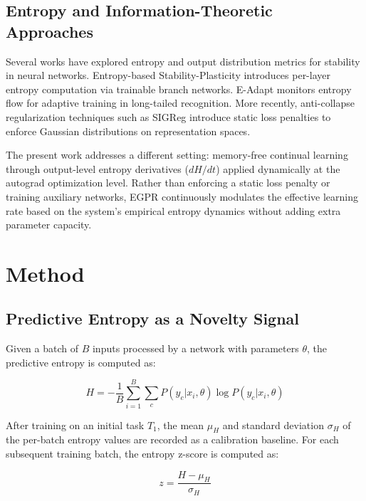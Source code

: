 \documentclass[11pt,a4paper]{article}
\begin{document}
\subsection{Entropy and Information-Theoretic Approaches}

Several works have explored entropy and output distribution metrics for stability in neural networks. Entropy-based Stability-Plasticity \citep[ESP;][]{chen2022entropy} introduces per-layer entropy computation via trainable branch networks. E-Adapt \citep{wang2026eadapt} monitors entropy flow for adaptive training in long-tailed recognition. More recently, anti-collapse regularization techniques such as SIGReg \citep{balestriero2025sigreg} introduce static loss penalties to enforce Gaussian distributions on representation spaces.

The present work addresses a different setting: memory-free continual learning through output-level entropy derivatives ($dH/dt$) applied dynamically at the autograd optimization level. Rather than enforcing a static loss penalty or training auxiliary networks, EGPR continuously modulates the effective learning rate based on the system's empirical entropy dynamics without adding extra parameter capacity.

\section{Method}

\subsection{Predictive Entropy as a Novelty Signal}

Given a batch of $B$ inputs processed by a network with parameters $\theta$, the predictive entropy is computed as:

\begin{equation}
H = -\frac{1}{B} \sum_{i=1}^{B} \sum_{c} P(y_c | x_i, \theta) \log P(y_c | x_i, \theta)
\end{equation}

After training on an initial task $T_1$, the mean $\mu_H$ and standard deviation $\sigma_H$ of the per-batch entropy values are recorded as a calibration baseline. For each subsequent training batch, the entropy z-score is computed as:

\begin{equation}
z = \frac{H - \mu_H}{\sigma_H}
\end{equation}
\end{document}
